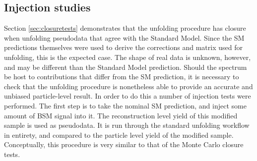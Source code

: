 \subsection{Injection studies}
\label{ssec:injectiontests}
Section \ref{sec:closuretests} demonstrates that the unfolding procedure has closure when unfolding pseudodata that agree with the Standard Model. Since the SM predictions themselves were used to derive the corrections and matrix used for unfolding, this is the expected case. The shape of real data is unknown, however, and may be different than the Standard Model prediction. Should the \mFourL spectrum be host to contributions that differ from the SM prediction, it is necessary to check that the unfolding procedure is nonetheless able to provide an accurate and unbiased particle-level result. In order to do this a number of injection tests were performed. The first step is to take the nominal SM prediction, and inject some amount of BSM signal into it. The reconstruction level yield of this modified sample is used as pseudodata. It is run through the standard unfolding workflow in entirety, and compared to the particle level yield of the modified sample. Conceptually, this procedure is very similar to that of the Monte Carlo closure tests. 

